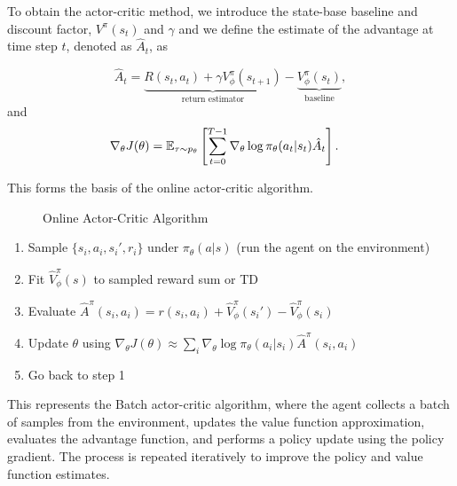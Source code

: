 \documentclass{article}
\begin{document}
To obtain the actor-critic method, we introduce the state-base baseline and discount factor, $V^\pi(s_t)$ and $\gamma$ and we define the estimate of the advantage at time step $t$, denoted as $\hat{A}_t$, as

$$\hat{A}_t = \underbrace{R(s_t,a_t) + \gamma V_\phi^\pi(s_{t+1})}_{\text{return estimator}} - \underbrace{V_\phi^\pi(s_t)}_{\text{baseline}},$$
and
\begin{align*}
    \nabla_\theta J(\theta) &= {\mathbb E}_{\tau \sim p_\theta} \left[\sum_{t=0}^{T-1} \nabla_\theta \log \pi_\theta(a_t \vert s_t) \hat A_t \right].
\end{align*}

This forms the basis of the online actor-critic algorithm.

\begin{figure}[ht]
\caption{Online Actor-Critic Algorithm}\label{fig:onlice_actor_critic}
\end{figure} 
% 
\begin{center}
\begin{tcolorbox}
[breakable,enhanced,colback=purple!10!white,colframe=purple!30!black,
title={Batch actor-critic algorithm},width=0.7\linewidth]
\begin{enumerate}[\hspace{1cm}(1)]
    \item Sample $\{s_i,a_i,s_i',r_i\}$ under $\pi_\theta(a|s)$ (run the agent on the environment)
    \item Fit $\hat{V}_\phi^\pi(s)$ to sampled reward sum or TD
    \item Evaluate $\hat{A}^\pi(s_i,a_i) = r(s_i,a_i) + \hat{V}_\phi^\pi(s_i') - \hat{V}_\phi^\pi(s_i)$
    \item Update $\theta$ using $\nabla_\theta J(\theta) \approx \sum_i \nabla_\theta \log\pi_\theta(a_i|s_i)\hat{A}^\pi(s_i,a_i)$
    \item Go back to step 1
\end{enumerate}
\end{tcolorbox}
\end{center}

This represents the Batch actor-critic algorithm, where the agent collects a batch of samples from the environment, updates the value function approximation, evaluates the advantage function, and performs a policy update using the policy gradient. The process is repeated iteratively to improve the policy and value function estimates.
\end{document}
